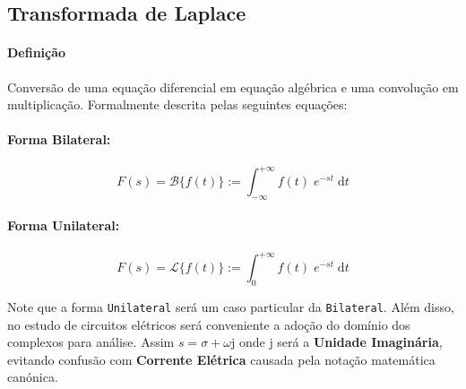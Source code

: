 \documentclass{article}
\begin{document}
\subsection{Transformada de Laplace}
    \paragraph{Definição}Conversão de uma equação diferencial em equação algébrica e uma convolução em multiplicação. Formalmente descrita pelas seguintes equações:
    \begin{multicols}{2}
        \raggedcolumns
        \paragraph{Forma Bilateral:}
        \begin{equation}
            \boxed{
                F(s) = \mathcal{B} \{ f(t) \} := \int_{-\infty}^{+\infty} f(t) \; e^{-st} \; \text{d}t
            }
        \end{equation}
        \columnbreak
        \paragraph{Forma Unilateral:}
        \begin{equation}
            \boxed{
                F(s) = \mathcal{L}\{ f(t) \} := \int_{0}^{+\infty} f(t) \; e^{-st} \; \text{d} t
            }
        \end{equation}
    \end{multicols}\noindent
    Note que a forma \texttt{Unilateral} será um caso particular da \texttt{Bilateral}. Além disso, no estudo de circuitos elétricos será conveniente a adoção do domínio dos complexos para análise. Assim $s = \sigma + \omega\text{j}$ onde $\text{j}$ será a \textbf{Unidade Imaginária}, evitando confusão com \textbf{Corrente Elétrica} causada pela notação matemática canónica.
\end{document}
